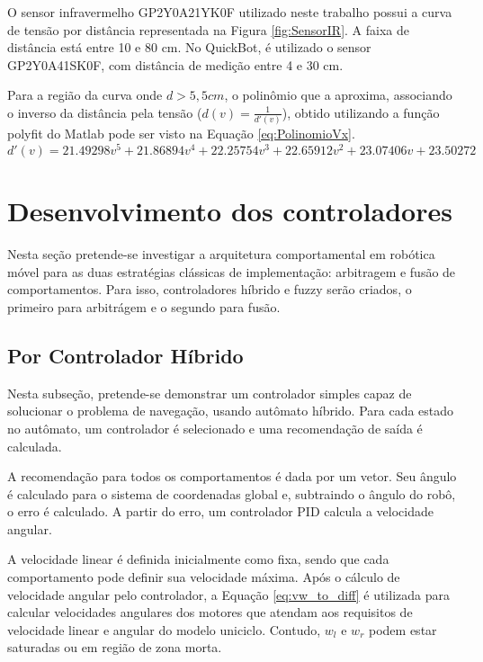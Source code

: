 O sensor infravermelho GP2Y0A21YK0F utilizado neste trabalho possui a curva de
tensão por distância representada na Figura \ref{fig:SensorIR}. A faixa de
distância está entre 10 e 80 cm. No QuickBot, é utilizado o sensor GP2Y0A41SK0F,
com distância de medição entre 4 e 30 cm.



Para a região da curva onde $d > 5,5 cm$, o polinômio que a aproxima, associando
o inverso da distância pela tensão ($d(v) = \frac{1}{d'(v)}$), obtido utilizando
a função polyfit do Matlab pode ser visto na Equação \ref{eq:PolinomioVx}.
\begin{equation}
	\label{eq:PolinomioVx}
	d'(v) = 21.49298 v^5 + 21.86894 v^4 + 22.25754 v^3 + 22.65912 v^2 + 23.07406 v
	+ 23.50272
\end{equation}


\section{Desenvolvimento dos controladores}

	Nesta seção pretende-se investigar a arquitetura comportamental em robótica 
	móvel para as duas estratégias clássicas de implementação: arbitragem e fusão de 
	comportamentos. Para isso, controladores híbrido e fuzzy serão criados, o primeiro
	para arbitrágem e o segundo para fusão.

	\subsection{Por Controlador Híbrido}
	
	Nesta subseção, pretende-se demonstrar um controlador simples capaz de 
	solucionar o problema de navegação, usando autômato híbrido. Para cada estado
	no autômato, um controlador é selecionado e uma recomendação de saída é 
	calculada. 
	
	A recomendação para todos os comportamentos é dada por um vetor. Seu ângulo é calculado 
	para  o sistema de coordenadas global e, subtraindo o ângulo do robô, o erro é calculado. 
	A partir do erro, um controlador PID calcula a velocidade angular. 
		
	A velocidade linear é definida inicialmente como fixa, sendo que cada comportamento pode 
	definir sua velocidade máxima. Após o cálculo de velocidade angular pelo controlador, a 
	Equação \ref{eq:vw_to_diff} é utilizada para calcular velocidades angulares dos motores
	que atendam aos requisitos de velocidade linear e angular do modelo uniciclo. Contudo, 
	$w_l$ e $w_r$ podem estar saturadas ou em região de zona morta. 
	
